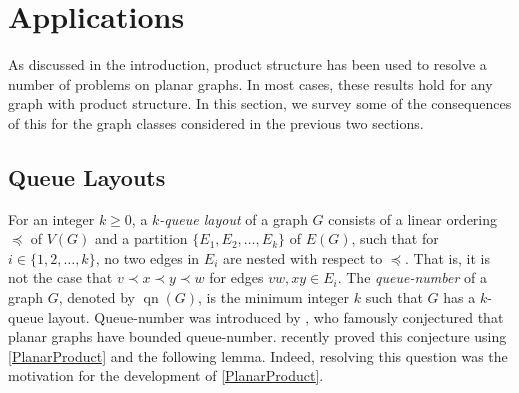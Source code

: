 \documentclass{patmorin}
\theoremstyle{plain}
\theoremstyle{definition}
\newcommand{\note}[2]{\noindent{\color{red}[#1:~#2]}}
\newcommand{\referee}[2]{\noindent\textcolor{blue}{\framebox{\begin{minipage}{\textwidth} Ref \#{#1}: #2\end{minipage}}}}
\DeclareMathOperator{\qn}{qn}
\renewcommand{\geq}{\geqslant}
\begin{document}
\section{Applications}
\label{Applications}

As discussed in the introduction, product structure has been used to resolve a number of problems on planar graphs.  In most cases, these results hold for any graph with product structure. In this section, we survey some of the consequences of this for the graph classes considered in the previous two sections.

%
%

\subsection{Queue Layouts}

For an integer $k\geq 0$, a \textit{$k$-queue layout} of a graph $G$ consists of a linear ordering $\preceq$ of $V(G)$ and a partition $\{E_1,E_2,\dots,E_k\}$ of $E(G)$, such that for $i\in\{1,2,\dots,k\}$, no two edges in $E_i$ are nested with respect to $\preceq$. That is, it is not the case that $v\prec x \prec y \prec w$ for edges $vw,xy\in E_i$. The \textit{queue-number} of a graph $G$, denoted by $\qn(G)$, is the minimum integer $k$ such that $G$ has a $k$-queue layout. Queue-number was introduced by \citet{HLR92}, who famously conjectured that planar graphs have bounded queue-number. \citet{DJMMUW20} recently proved this conjecture using \cref{PlanarProduct} and the following lemma. Indeed, resolving this question was the motivation for the development of \cref{PlanarProduct}.
\end{document}
